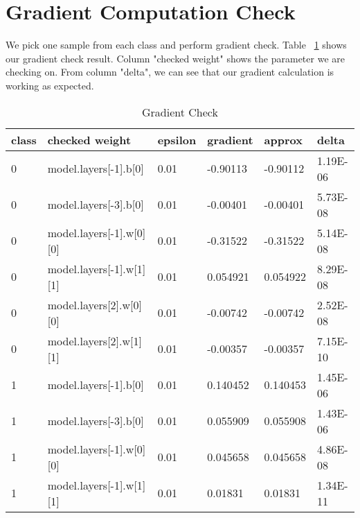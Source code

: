 \documentclass{article} %
\begin{document}
\section{Gradient Computation Check}
We pick one sample from each class and perform gradient check. Table ~\ref{table:gradCheck} shows our gradient check result. Column "checked weight" shows the parameter we are checking on. From column "delta", we can see that our gradient calculation is working as expected.
\begin{table}[]
\caption{Gradient Check}
\label{table:gradCheck}
\begin{tabular}{|l|l|l|l|l|l|}
\hline
\textbf{class} & \textbf{checked weight}              & \textbf{epsilon} & \textbf{gradient} & \textbf{approx} & \textbf{delta} \\ \hline
0              & model.layers{[}-1{]}.b{[}0{]}        & 0.01             & -0.90113          & -0.90112        & 1.19E-06       \\ \hline
0              & model.layers{[}-3{]}.b{[}0{]}        & 0.01             & -0.00401          & -0.00401        & 5.73E-08       \\ \hline
0              & model.layers{[}-1{]}.w{[}0{]}{[}0{]} & 0.01             & -0.31522          & -0.31522        & 5.14E-08       \\ \hline
0              & model.layers{[}-1{]}.w{[}1{]}{[}1{]} & 0.01             & 0.054921          & 0.054922        & 8.29E-08       \\ \hline
0              & model.layers{[}2{]}.w{[}0{]}{[}0{]}  & 0.01             & -0.00742          & -0.00742        & 2.52E-08       \\ \hline
0              & model.layers{[}2{]}.w{[}1{]}{[}1{]}  & 0.01             & -0.00357          & -0.00357        & 7.15E-10       \\ \hline
1              & model.layers{[}-1{]}.b{[}0{]}        & 0.01             & 0.140452          & 0.140453        & 1.45E-06       \\ \hline
1              & model.layers{[}-3{]}.b{[}0{]}        & 0.01             & 0.055909          & 0.055908        & 1.43E-06       \\ \hline
1              & model.layers{[}-1{]}.w{[}0{]}{[}0{]} & 0.01             & 0.045658          & 0.045658        & 4.86E-08       \\ \hline
1              & model.layers{[}-1{]}.w{[}1{]}{[}1{]} & 0.01             & 0.01831           & 0.01831         & 1.34E-11       \\ \hline

\end{tabular}
\end{table}
\end{document}
